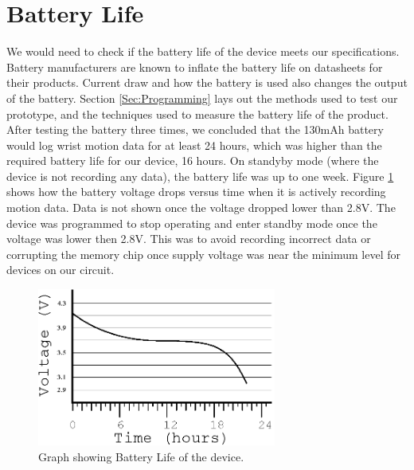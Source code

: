 \section{Battery Life}
\label{Sec:ResultsBatteryLife}
We would need to check if the battery life of the device meets our specifications.
Battery manufacturers are known to inflate the battery life on datasheets for their products.
Current draw and how the battery is used also changes the output of the battery.
Section \ref{Sec:Programming} lays out the methods used to test our prototype,
and the techniques used to measure the battery life of the product.
After testing the battery three times,
we concluded that the 130mAh battery would log wrist motion data for at least 24 hours,
which was higher than the required battery life for our device,
16 hours.
On standyby mode (where the device is not recording any data), the battery life was up to one week.
Figure \ref{Fig:BatteryGraph} shows how the battery voltage drops versus time when it is actively recording motion data.
Data is not shown once the voltage dropped lower than 2.8V. The device was programmed to stop operating and enter standby mode once the voltage was lower then 2.8V. This was to avoid recording incorrect data or corrupting the memory chip once supply voltage was near the minimum level for devices on our circuit.

\begin{figure}
\begin{center}
\includegraphics[width=0.7\textwidth]{images/BattLife.eps}
\caption{Graph showing Battery Life of the device.}
\label{Fig:BatteryGraph}
\end{center}
\end{figure}

